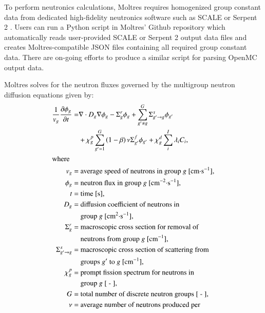 To perform neutronics calculations, Moltres requires homogenized group constant
data from dedicated high-fidelity neutronics software such as SCALE
\citep{dehart_reactor_2011} or Serpent 2 \citep{leppanen_serpent_2014}. Users can
run a Python script in Moltres' Github repository which automatically reads
user-provided SCALE or Serpent 2 output data files and creates
Moltres-compatible JSON files containing all required group constant data.
There are on-going efforts to produce a similar script for parsing OpenMC
output data.

Moltres solves for the neutron fluxes governed by
the multigroup neutron diffusion equations given by:
%
\begin{align}
    \frac{1}{v_g} \frac{\partial \phi_g}{\partial t} =& \nabla \cdot D_g
    \nabla \phi_g - \Sigma^r_g \phi_g +
    \sum^G_{g' \neq g} \Sigma^s_{g' \rightarrow g} \phi_{g'} \nonumber \\
    &+ \chi^p_g \sum^G_{g'=1} \left( 1-\beta \right) \nu \Sigma^f_{g'}
    \phi_{g'} + \chi^d_g \sum^I_i \lambda_i C_i, \label{eq:neut} \\
    \intertext{where}
    v_g =& \text{ average speed of neutrons in group $g$ [cm$\cdot$s$^{-1}$],} 
    \nonumber \\
    \phi_g =& \text{ neutron flux in group $g$ [cm$^{-2}\cdot$s$^{-1}$],}
    \nonumber \\
    t =& \text{ time [s],} \nonumber \\
    D_g =& \text{ diffusion coefficient of neutrons in} \nonumber \\
    &\text{ group $g$ [cm$^2\cdot$s$^{-1}$],} \nonumber \\
    \Sigma^r_g =& \text{ macroscopic cross section for removal of} \nonumber \\
    &\text{ neutrons from group $g$ [cm$^{-1}$],} \nonumber \\
    \Sigma^s_{g' \rightarrow g} =& \text{ macroscopic cross section of
    scattering from} \nonumber \\
    &\text{ groups $g'$ to $g$ [cm$^{-1}$],} \nonumber \\
    \chi^p_g =& \text{ prompt fission spectrum for neutrons in} \nonumber \\
    &\text{ group $g$ [ - ],} \nonumber \\
    G =& \text{ total number of discrete neutron groups [ - ],} \nonumber \\
    \nu =& \text{ average number of neutrons produced per} \nonumber \\

\end{align}
